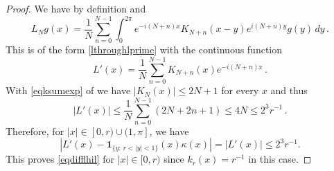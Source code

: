 \documentclass[10pt,a4paper]{article}
\theoremstyle{plain}
\theoremstyle{definition}
\numberwithin{equation}{subsection}
\newcommand{\leanok}{}
\begin{document}
\begin{proof}
\leanok
We have by definition and 
\begin{equation}
    L_Ng(x)=
    \frac 1N\sum_{n=0}^{N-1}
       \int_0^{2\pi} e^{-i(N+n)x} K_{N+n}(x-y) e^{i(N+n)y}g(y)
\, dy \, .\end{equation}
This is of the form \eqref{lthroughlprime} with
the continuous function
\begin{equation}
    {L'}(x)= \frac 1N\sum_{n=0}^{N-1}
      K_{N+n}(x) e^{-i(N+n)x}\, .
\end{equation}
With \eqref{eqksumexp} of 
we have $|K_N(x)|\le 2N+1$ for every $x$ and thus
\begin{equation}\label{eqhil13}
    |{L'}(x)|\le \frac 1N\sum_{n=0}^{N-1}
      (2N+2n+1) \le 4N\le 2^3 r^{-1}\, .
\end{equation}
Therefore, for $|x|\in [0, r)\cup (1, \pi]$, we have
\begin{equation}
    \label{eqdiffzero}
    \left|L'(x)-\mathbf{1}_{\{y:\, r<|y|<1\}}(x)\kappa(x)\right|=|L'(x)|\leq 2^{3} r^{-1}.
\end{equation}
This proves \eqref{eqdifflhil} for $|x|\in [0, r)$ since $k_r(x)=r^{-1}$ in this case.


\end{proof}
\end{document}
